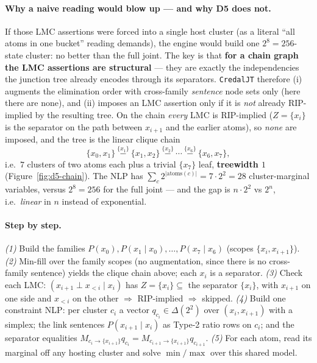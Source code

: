 \documentclass[11pt]{article}
\begin{document}
\paragraph{Why a naive reading would blow up --- and why D5 does not.} If those LMC assertions
were forced into a single host cluster (as a literal ``all atoms in one bucket'' reading demands),
the engine would build one $2^8=256$-state cluster: no better than the full joint. The key is that
\textbf{for a chain graph the LMC assertions are structural} --- they are exactly the
independencies the junction tree already encodes through its separators. \texttt{CredalJT}
therefore (i) augments the elimination order with cross-family \emph{sentence} node sets only
(here there are none), and (ii) imposes an LMC assertion only if it is \emph{not} already
RIP-implied by the resulting tree. On the chain \emph{every} LMC is RIP-implied
($Z=\{x_i\}$ is the separator on the path between $x_{i+1}$ and the earlier atoms), so
\emph{none} are imposed, and the tree is the linear clique chain
\[
  \{x_0,x_1\}\ \overset{\{x_1\}}{-}\ \{x_1,x_2\}\ \overset{\{x_2\}}{-}\ \cdots\ \overset{\{x_6\}}{-}\ \{x_6,x_7\},
\]
i.e.\ $7$ clusters of two atoms each plus a trivial $\{x_7\}$ leaf, \textbf{treewidth $1$}
(Figure~\ref{fig:d5-chain}). The NLP has $\sum_c 2^{|\mathrm{atoms}(c)|}=7\cdot 2^2=28$
cluster-marginal variables, versus $2^8=256$ for the full joint --- and the gap is
$n\cdot 2^2$ vs $2^n$, i.e.\ \emph{linear} in $n$ instead of exponential.

\paragraph{Step by step.}
\emph{(1)} Build the families $P(x_0),P(x_1\mid x_0),\dots,P(x_7\mid x_6)$ (scopes
$\{x_i,x_{i+1}\}$). \emph{(2)} Min-fill over the family scopes (no augmentation, since there is no
cross-family sentence) yields the clique chain above; each $x_i$ is a separator.
\emph{(3)} Check each LMC: $(x_{i+1}\perp x_{<i}\mid x_i)$ has $Z=\{x_i\}\subseteq$ the separator
$\{x_i\}$, with $x_{i+1}$ on one side and $x_{<i}$ on the other $\Rightarrow$ RIP-implied
$\Rightarrow$ skipped. \emph{(4)} Build one constraint NLP: per cluster $c_i$ a vector
$q_{c_i}\in\Delta(2^2)$ over $(x_i,x_{i+1})$ with a simplex; the link sentences
$P(x_{i+1}\mid x_i)$ as Type-2 ratio rows on $c_i$; and the separator equalities
$M_{c_i\to\{x_{i+1}\}}q_{c_i}=M_{c_{i+1}\to\{x_{i+1}\}}q_{c_{i+1}}$. \emph{(5)} For each atom, read
its marginal off any hosting cluster and solve $\min/\max$ over this shared model.
\end{document}
